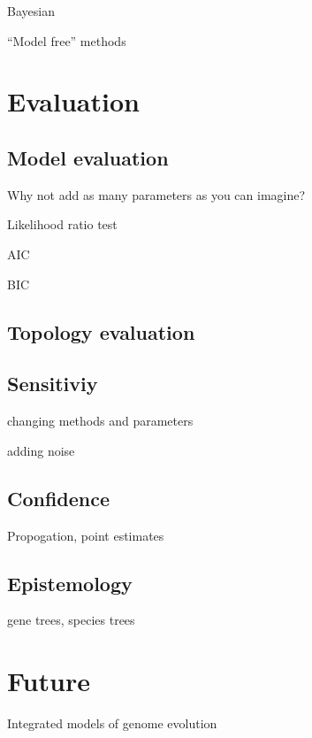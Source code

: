 \documentclass[
]{book}
\begin{document}
Bayesian

``Model free'' methods

\hypertarget{evaluation}{%
\chapter{Evaluation}\label{evaluation}}

\hypertarget{model-evaluation}{%
\section{Model evaluation}\label{model-evaluation}}

Why not add as many parameters as you can imagine?

Likelihood ratio test

AIC

BIC

\hypertarget{topology-evaluation}{%
\section{Topology evaluation}\label{topology-evaluation}}

\hypertarget{sensitiviy}{%
\section{Sensitiviy}\label{sensitiviy}}

changing methods and parameters

adding noise

\hypertarget{confidence}{%
\section{Confidence}\label{confidence}}

Propogation, point estimates

\hypertarget{epistemology}{%
\section{Epistemology}\label{epistemology}}

gene trees, species trees

\hypertarget{future}{%
\chapter{Future}\label{future}}

Integrated models of genome evolution
\end{document}
